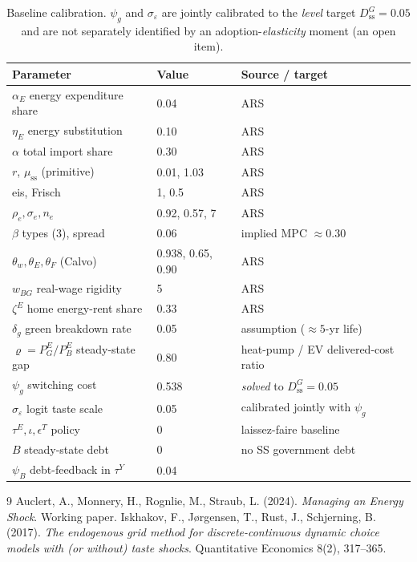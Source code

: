 \documentclass[11pt]{article}
\newcommand{\stst}{\mathrm{ss}}
\newcommand{\DG}{D^{G}}
\newcommand{\PEB}{P^{E}_{B}}
\newcommand{\PEG}{P^{E}_{G}}
\begin{document}
\begin{table}[h]\centering\small
\begin{tabular}{lll}
\toprule
Parameter & Value & Source / target\\
\midrule
$\alpha_E$ energy expenditure share & 0.04 & ARS\\
$\eta_E$ energy substitution & 0.10 & ARS\\
$\alpha$ total import share & 0.30 & ARS\\
$r$, $\mu_{\stst}$ (primitive) & 0.01, 1.03 & ARS\\
eis, Frisch & 1, 0.5 & ARS\\
$\rho_e,\sigma_e,n_e$ & 0.92, 0.57, 7 & ARS\\
$\beta$ types (3), spread & 0.06 & implied MPC $\approx 0.30$\\
$\theta_w,\theta_E,\theta_F$ (Calvo) & 0.938, 0.65, 0.90 & ARS\\
$w_{BG}$ real-wage rigidity & 5 & ARS\\
$\zeta^{E}$ home energy-rent share & 0.33 & ARS\\
\midrule
$\delta_g$ green breakdown rate & 0.05 & assumption ($\approx 5$-yr life)\\
$\varrho=\PEG/\PEB$ steady-state gap & 0.80 & heat-pump / EV delivered-cost ratio\\
$\psi_g$ switching cost & 0.538 & \emph{solved} to $\DG_{\stst}=0.05$\\
$\sigma_\varepsilon$ logit taste scale & 0.05 & calibrated jointly with $\psi_g$\\
\midrule
$\tau^{E},\iota,\epsilon^{T}$ policy & 0 & laissez-faire baseline\\
$B$ steady-state debt & 0 & no SS government debt\\
$\psi_B$ debt-feedback in $\tau^{Y}$ & 0.04 & \\
\bottomrule
\end{tabular}
\caption{Baseline calibration. $\psi_g$ and $\sigma_\varepsilon$ are jointly
calibrated to the \emph{level} target $\DG_{\stst}=0.05$ and are not separately
identified by an adoption-\emph{elasticity} moment (an open item).}
\end{table}

\begin{thebibliography}{9}
 Auclert, A., Monnery, H., Rognlie, M., Straub, L. (2024).
\emph{Managing an Energy Shock}. Working paper.
 Iskhakov, F., J{\o}rgensen, T., Rust, J., Schjerning, B.
(2017). \emph{The endogenous grid method for discrete-continuous dynamic choice
models with (or without) taste shocks}. Quantitative Economics 8(2), 317--365.
\end{thebibliography}
\end{document}
